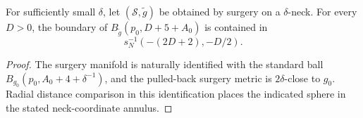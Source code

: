 \begin{lemma}
\label{lem:surgery-result-metric-ball-bounds}
\label{stdballs}
For sufficiently small $\delta$, let $({\mathcal S},\widetilde g)$ be obtained
by surgery on a $\delta$-neck. For every $D>0$, the boundary of
$B_{\widetilde g}(p_0,D+5+A_0)$ is contained in
\[
  s_N^{-1}(-(2D+2),-D/2).
\]
\end{lemma}

\begin{proof}
\sketch
The surgery manifold is naturally identified with the standard ball
$B_{g_0}(p_0,A_0+4+\delta^{-1})$, and the pulled-back surgery metric is
$2\delta$-close to $g_0$. Radial distance comparison in this identification
places the indicated sphere in the stated neck-coordinate annulus.
\end{proof}
